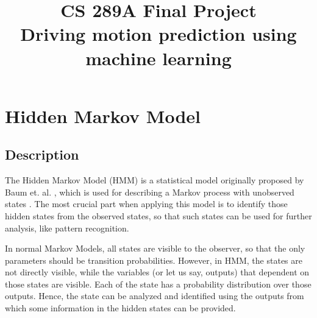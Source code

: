 \documentclass[conference]{IEEEtran}
\begin{document}
\title{CS 289A Final Project\\
Driving motion prediction using machine learning
}
\author{
\and
{}
\and
{}
\and
{}
}

\maketitle

\section{Hidden Markov Model}
\subsection{Description}
The Hidden Markov Model (HMM) is a statistical model originally proposed by Baum et. al. \cite{hmm1}, which is used for describing a Markov process with unobserved states \cite{hmm2}. The most crucial part when applying this model is to identify those hidden states from the observed states, so that such states can be used for further analysis, like pattern recognition. 

In normal Markov Models, all states are visible to the observer, so that the only parameters should be transition probabilities. However, in HMM, the states are not directly visible, while the variables (or let us say, outputs) that dependent on those states are visible. Each of the state has a probability distribution over those outputs. Hence, the state can be analyzed and identified using the outputs from which some information in the hidden states can be provided.
\end{document}
